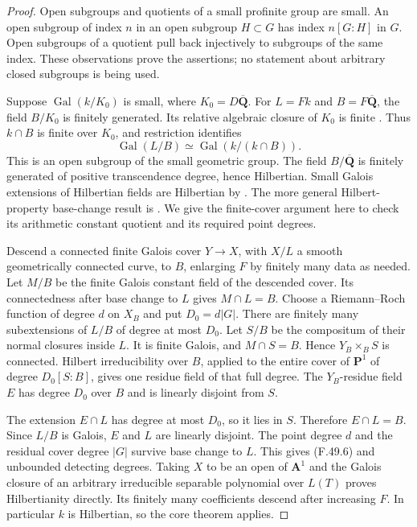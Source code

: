 \begin{proof}
Open subgroups and quotients of a small profinite group are small.
An open subgroup of index \(n\) in an open subgroup \(H\subset G\)
has index \(n[G:H]\) in \(G\). Open subgroups of a quotient pull
back injectively to subgroups of the same index. These observations
prove the assertions; no statement about arbitrary closed subgroups
is being used.

Suppose \(\operatorname{Gal}(k/K_0)\) is small, where
\(K_0=D\overline{\mathbf Q}\).
For \(L=Fk\) and \(B=F\overline{\mathbf Q}\), the field \(B/K_0\)
is finitely generated. Its relative algebraic closure of \(K_0\)
is finite \citep[Lemma~9.26.11, Tag~030D]{F_StacksFields}.
Thus \(k\cap B\) is finite over \(K_0\), and restriction identifies
\[
 \operatorname{Gal}(L/B)
     \simeq\operatorname{Gal}(k/(k\cap B)).
 \tag{F.49.15}
\]
This is an open subgroup of the small geometric group.
The field \(B/\overline{\mathbf Q}\) is finitely generated of
positive transcendence degree, hence Hilbertian.
Small Galois extensions of Hilbertian fields are Hilbertian by
\citet[Theorem~4.4, author p.~9]{F_BarySoroker2008}.
The more general Hilbert-property base-change result is
\citet[Theorem~1.2 and Corollary~4.3, pp.~1, 5]{F_BarySorokerFehmPetersen2023}.
We give the finite-cover argument here to check its arithmetic
constant quotient and its required point degrees.

Descend a connected finite Galois cover \(Y\to X\), with \(X/L\)
a smooth geometrically connected curve, to \(B\), enlarging \(F\)
by finitely many data as needed. Let \(M/B\) be the finite Galois
constant field of the descended cover. Its connectedness after
base change to \(L\) gives \(M\cap L=B\).
Choose a Riemann--Roch function of degree \(d\) on \(X_B\) and
put \(D_0=d|G|\).
There are finitely many subextensions of \(L/B\) of degree at
most \(D_0\). Let \(S/B\) be the compositum of their normal
closures inside \(L\). It is finite Galois, and
\(M\cap S=B\). Hence \(Y_B\times_B S\) is connected.
Hilbert irreducibility over \(B\), applied to the entire cover of
\(\mathbf P^1\) of degree \(D_0[S:B]\), gives one residue field
of that full degree. The \(Y_B\)-residue field \(E\) has degree
\(D_0\) over \(B\) and is linearly disjoint from \(S\).

The extension \(E\cap L\) has degree at most \(D_0\), so it lies
in \(S\). Therefore \(E\cap L=B\).
Since \(L/B\) is Galois, \(E\) and \(L\) are linearly disjoint.
The point degree \(d\) and the residual cover degree \(|G|\)
survive base change to \(L\). This gives (F.49.6) and unbounded
detecting degrees. Taking \(X\) to be an open of \(\mathbf A^1\)
and the Galois closure of an arbitrary irreducible separable
polynomial over \(L(T)\) proves Hilbertianity directly.
Its finitely many coefficients descend after increasing \(F\).
In particular \(k\) is Hilbertian, so the core theorem applies.


\end{proof}
